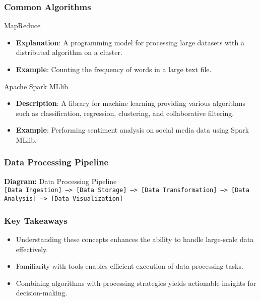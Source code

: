 \documentclass[aspectratio=169]{beamer}
\begin{document}
\begin{frame}[fragile]
    \frametitle{Common Algorithms}
    \begin{block}{MapReduce}
        \begin{itemize}
            \item \textbf{Explanation}: A programming model for processing large datasets with a distributed algorithm on a cluster.
            \item \textbf{Example}: Counting the frequency of words in a large text file.
        \end{itemize}
    \end{block}
    
    \begin{block}{Apache Spark MLlib}
        \begin{itemize}
            \item \textbf{Description}: A library for machine learning providing various algorithms such as classification, regression, clustering, and collaborative filtering.
            \item \textbf{Example}: Performing sentiment analysis on social media data using Spark MLlib.
        \end{itemize}
    \end{block}
\end{frame}

\begin{frame}[fragile]
    \frametitle{Data Processing Pipeline}
    \begin{center}
        \textbf{Diagram:} Data Processing Pipeline\\
        \texttt{[Data Ingestion] --> [Data Storage] --> [Data Transformation] --> [Data Analysis] --> [Data Visualization]}
    \end{center}
\end{frame}

\begin{frame}[fragile]
    \frametitle{Key Takeaways}
    \begin{itemize}
        \item Understanding these concepts enhances the ability to handle large-scale data effectively.
        \item Familiarity with tools enables efficient execution of data processing tasks.
        \item Combining algorithms with processing strategies yields actionable insights for decision-making.
    \end{itemize}
\end{frame}
\end{document}
